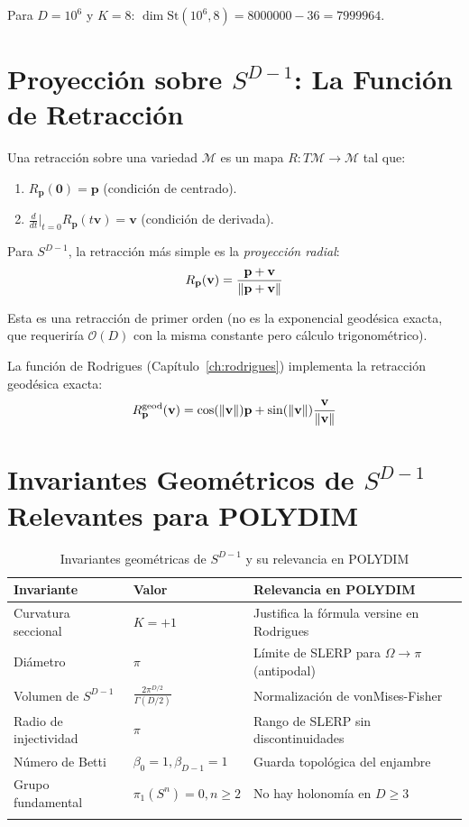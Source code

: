Para $D = 10^6$ y $K = 8$: $\dim \text{St}(10^6, 8) = 8000000 - 36 = 7999964$.

\section{Proyección sobre $S^{D-1}$: La Función de Retracción}

\begin{definition}[Retracción]
Una retracción sobre una variedad $\mathcal{M}$ es un mapa $R: T\mathcal{M} \to \mathcal{M}$
tal que:
\begin{enumerate}
\item $R_{\mathbf{p}}(\mathbf{0}) = \mathbf{p}$ (condición de centrado).
\item $\frac{d}{dt}\Big|_{t=0} R_{\mathbf{p}}(t\mathbf{v}) = \mathbf{v}$ (condición de derivada).
\end{enumerate}
\end{definition}

Para $S^{D-1}$, la retracción más simple es la \textit{proyección radial}:
\begin{equation}
R_{\mathbf{p}}(\mathbf{v}) = \frac{\mathbf{p} + \mathbf{v}}{\norm{\mathbf{p} + \mathbf{v}}}
\label{eq:retraccion_esfera}
\end{equation}

Esta es una retracción de primer orden (no es la exponencial geodésica exacta,
que requeriría $\mathcal{O}(D)$ con la misma constante pero cálculo trigonométrico).

La función de Rodrigues (Capítulo~\ref{ch:rodrigues}) implementa la retracción
geodésica exacta:
\begin{equation}
R_{\mathbf{p}}^{\text{geod}}(\mathbf{v}) = \cos(\norm{\mathbf{v}})\mathbf{p} + \sin(\norm{\mathbf{v}})\frac{\mathbf{v}}{\norm{\mathbf{v}}}
\label{eq:exp_map}
\end{equation}

\section{Invariantes Geométricos de $S^{D-1}$ Relevantes para POLYDIM}

\begin{longtable}{llp{6cm}}
\toprule
\textbf{Invariante} & \textbf{Valor} & \textbf{Relevancia en POLYDIM} \\
\midrule
Curvatura seccional & $K = +1$ & Justifica la fórmula versine en Rodrigues \\
Diámetro & $\pi$ & Límite de SLERP para $\Omega \to \pi$ (antipodal) \\
Volumen de $S^{D-1}$ & $\frac{2\pi^{D/2}}{\Gamma(D/2)}$ & Normalización de vonMises-Fisher \\
Radio de injectividad & $\pi$ & Rango de SLERP sin discontinuidades \\
Número de Betti & $\beta_0=1, \beta_{D-1}=1$ & Guarda topológica del enjambre \\
Grupo fundamental & $\pi_1(S^n)=0, n\ge 2$ & No hay holonomía en $D \ge 3$ \\
\bottomrule
\caption{Invariantes geométricas de $S^{D-1}$ y su relevancia en POLYDIM}
\label{tab:invariantes}
\end{longtable}

